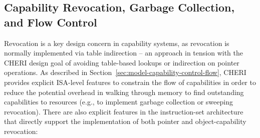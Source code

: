 \subsection{Capability Revocation, Garbage Collection, and Flow Control}
\label{sec:model-capability-revocation}

Revocation is a key design concern in capability systems, as revocation is
normally implemented via table indirection -- an approach in tension with the
CHERI design goal of avoiding table-based lookups or indirection on pointer
operations.
As described in Section~\ref{sec:model-capability-control-flow}, CHERI provides
explicit ISA-level features to constrain the flow of capabilities in order to
reduce the potential overhead in walking through memory to find outstanding
capabilities to resources (e.g., to implement garbage collection or sweeping
revocation).
There are also explicit features in the instruction-set architecture that
directly support the implementation of both pointer and object-capability
revocation:

